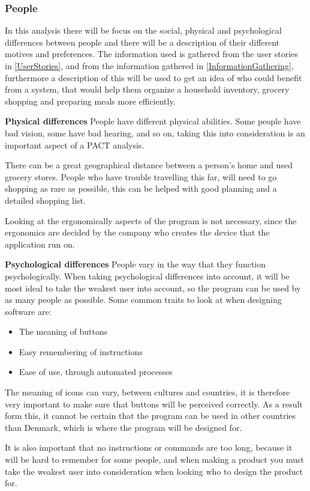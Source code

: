 \subsubsection{People} \label{PeoplePACT}
In this analysis there will be focus on the social, physical and psychological differences between people and there will be a description of their different motives and preferences. The information used is gathered from the user stories in \cref{UserStories}, and from the information gathered in \cref{InformationGathering}, furthermore a description of this will be used to get an idea of who could benefit from a system, that would help them organize a household inventory, grocery shopping and preparing meals more efficiently.

\textbf{Physical differences}
People have different physical abilities. Some people have bad vision, some have bad hearing, and so on, taking this into consideration is an important aspect of a PACT analysis.

There can be a great geographical distance between a person's home and used grocery stores. People who have trouble travelling this far, will need to go shopping as rare as possible, this can be helped with good planning and a detailed shopping list.

Looking at the ergonomically aspects of the program is not necessary, since the ergonomics are decided by the company who creates the device that the application run on.

\textbf{Psychological differences}
People vary in the way that they function psychologically. When taking psychological differences into account, it will be most ideal to take the weakest user into account, so the program can be used by as many people as possible. Some common traits to look at when designing software are:
\begin{itemize}
    \item The meaning of buttons
    \item Easy remembering of instructions
    \item Ease of use, through automated processes
\end{itemize}
The meaning of icons can vary, between cultures and countries, it is therefore very important to make sure that buttons will be perceived correctly. As a result form this, it cannot be certain that the program can be used in other countries than Denmark, which is where the program will be designed for.

It is also important that no instructions or commands are too long, because it will be hard to remember for some people, and when making a product you must take the weakest user into consideration when looking who to design the product for.

